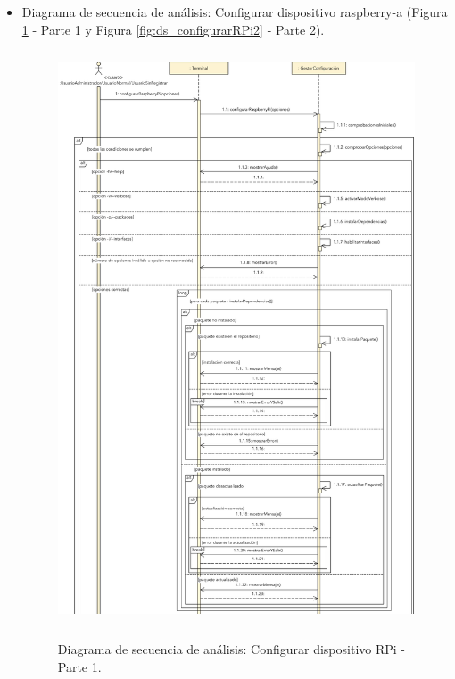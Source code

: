 \documentclass[12pt,a4paper, twoside]{report}
\begin{document}
	\begin{itemize}
		\item Diagrama de secuencia de análisis: Configurar dispositivo \gls{raspberry-a} (Figura \ref{fig:ds_configurarRPi1} - Parte 1 y Figura \ref{fig:ds_configurarRPi2} - Parte 2).
		
		\begin{figure}[!ht]   
			\caption{Diagrama de secuencia de análisis: Configurar dispositivo RPi - Parte 1.} 
			\begin{center} 
	 			\includegraphics[width=17cm,height=17cm]{Images/analysis/secuencia/secuencia_configurarRPi_parte1} \\
				\label{fig:ds_configurarRPi1} 
			\end{center}  
		\end{figure} 
		

\end{itemize}
\end{document}
